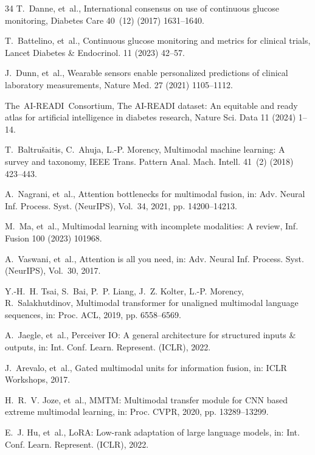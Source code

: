 \documentclass[a4paper,fleqn]{cas-dc}
\begin{document}
\begin{thebibliography}{34}
T.~Danne, et~al., International consensus on use of continuous glucose monitoring, Diabetes Care 40~(12) (2017) 1631--1640.

T.~Battelino, et~al., Continuous glucose monitoring and metrics for clinical trials, Lancet Diabetes \& Endocrinol. 11 (2023) 42--57.

J.~Dunn, et~al., Wearable sensors enable personalized predictions of clinical laboratory measurements, Nature Med. 27 (2021) 1105--1112.

The~AI-READI~Consortium, The AI-READI dataset: An equitable and ready atlas for artificial intelligence in diabetes research, Nature Sci. Data 11 (2024) 1--14.

T.~Baltru{\v{s}}aitis, C.~Ahuja, L.-P. Morency, Multimodal machine learning: A survey and taxonomy, IEEE Trans. Pattern Anal. Mach. Intell. 41~(2) (2018) 423--443.

A.~Nagrani, et~al., Attention bottlenecks for multimodal fusion, in: Adv. Neural Inf. Process. Syst. (NeurIPS), Vol.~34, 2021, pp. 14200--14213.

M.~Ma, et~al., Multimodal learning with incomplete modalities: A review, Inf. Fusion 100 (2023) 101968.

A.~Vaswani, et~al., Attention is all you need, in: Adv. Neural Inf. Process. Syst. (NeurIPS), Vol.~30, 2017.

Y.-H.~H. Tsai, S.~Bai, P.~P. Liang, J.~Z. Kolter, L.-P. Morency, R.~Salakhutdinov, Multimodal transformer for unaligned multimodal language sequences, in: Proc. ACL, 2019, pp. 6558--6569.

A.~Jaegle, et~al., Perceiver IO: A general architecture for structured inputs \& outputs, in: Int. Conf. Learn. Represent. (ICLR), 2022.

J.~Arevalo, et~al., Gated multimodal units for information fusion, in: ICLR Workshops, 2017.

H.~R.~V. Joze, et~al., MMTM: Multimodal transfer module for CNN based extreme multimodal learning, in: Proc. CVPR, 2020, pp. 13289--13299.

E.~J. Hu, et~al., LoRA: Low-rank adaptation of large language models, in: Int. Conf. Learn. Represent. (ICLR), 2022.


\end{thebibliography}
\end{document}
